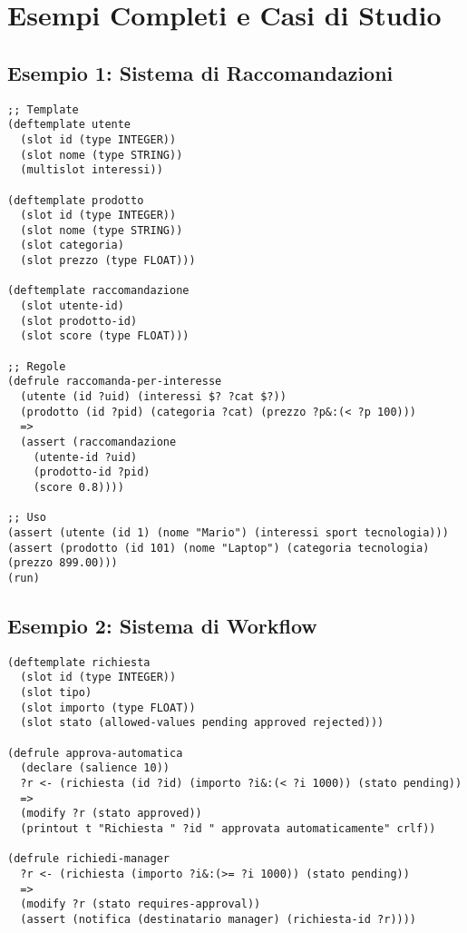 
\chapter{Esempi Completi e Casi di Studio}
\label{app:esempi}

\section{Esempio 1: Sistema di Raccomandazioni}

\begin{lstlisting}[language=CLIPS]
;; Template
(deftemplate utente
  (slot id (type INTEGER))
  (slot nome (type STRING))
  (multislot interessi))

(deftemplate prodotto
  (slot id (type INTEGER))
  (slot nome (type STRING))
  (slot categoria)
  (slot prezzo (type FLOAT)))

(deftemplate raccomandazione
  (slot utente-id)
  (slot prodotto-id)
  (slot score (type FLOAT)))

;; Regole
(defrule raccomanda-per-interesse
  (utente (id ?uid) (interessi $? ?cat $?))
  (prodotto (id ?pid) (categoria ?cat) (prezzo ?p&:(< ?p 100)))
  =>
  (assert (raccomandazione 
    (utente-id ?uid)
    (prodotto-id ?pid)
    (score 0.8))))

;; Uso
(assert (utente (id 1) (nome "Mario") (interessi sport tecnologia)))
(assert (prodotto (id 101) (nome "Laptop") (categoria tecnologia) (prezzo 899.00)))
(run)
\end{lstlisting}

\section{Esempio 2: Sistema di Workflow}

\begin{lstlisting}[language=CLIPS]
(deftemplate richiesta
  (slot id (type INTEGER))
  (slot tipo)
  (slot importo (type FLOAT))
  (slot stato (allowed-values pending approved rejected)))

(defrule approva-automatica
  (declare (salience 10))
  ?r <- (richiesta (id ?id) (importo ?i&:(< ?i 1000)) (stato pending))
  =>
  (modify ?r (stato approved))
  (printout t "Richiesta " ?id " approvata automaticamente" crlf))

(defrule richiedi-manager
  ?r <- (richiesta (importo ?i&:(>= ?i 1000)) (stato pending))
  =>
  (modify ?r (stato requires-approval))
  (assert (notifica (destinatario manager) (richiesta-id ?r))))
\end{lstlisting}

